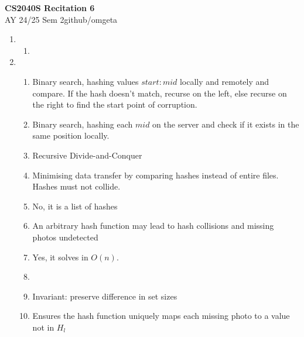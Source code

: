 \documentclass[12pt, a4paper]{article}
\newcommand{\mytitle}{CS2040S Recitation 6}
\newcommand{\myauthor}{github/omgeta}
\newcommand{\mydate}{AY 24/25 Sem 2}
\begin{document}
\raggedright
\footnotesize
\begin{center}
{\normalsize{\textbf{\mytitle}}} \\
{\footnotesize{\mydate\hspace{2pt}\textemdash\hspace{2pt}\myauthor}}
\end{center}
\begin{enumerate}[Q\arabic*.]
  \item 
    \begin{enumerate}[(\alph*.)]
      \item 

    \end{enumerate}

  \item 
    \begin{enumerate}[(\alph*.)]
      \item Binary search, hashing values $start:mid$ locally and remotely and compare. If the hash doesn't match, recurse on the left, else recurse on the right to find the start point of corruption.

      \item Binary search, hashing each $mid$ on the server and check if it exists in the same position locally.

      \item Recursive Divide-and-Conquer

      \item  Minimising data transfer by comparing hashes instead of entire files. Hashes must not collide.

      \item No, it is a list of hashes

      \item An arbitrary hash function may lead to hash collisions and missing photos undetected

      \item Yes, it solves in $O(n)$.

      \item 

      \item Invariant: preserve difference in set sizes

      \item Ensures the hash function uniquely maps each missing photo to a value not in $H_l$
    \end{enumerate}
\end{enumerate}
\end{document}
